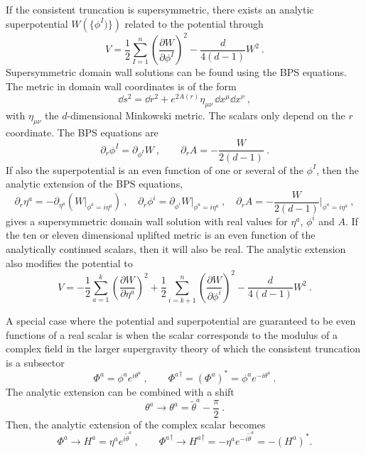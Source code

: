 If the consistent truncation is supersymmetric, there exists an analytic superpotential $W\left(\{\phi^I)\}\right)$ related to the potential through
\begin{equation}
V=\frac{1}{2}\sum_{I=1}^n\left(\frac{\partial W}{\partial \phi^I}\right)^2-\frac{d}{4(d-1)}W^2\ .
\end{equation}
Supersymmetric domain wall solutions can be found using the BPS equations. The metric in domain wall coordinates is of the form
\begin{equation}
	\label{eq:domain_wall}
	\dd s^2
	=
	\dd r^2 + e^{2A(r)}\eta_{\mu\nu}\,\dd x^\mu \dd x^\nu\ ,
\end{equation}
with $\eta_{\mu\nu}$ the $d$-dimensional Minkowski metric. The scalars only depend on the $r$ coordinate. The BPS equations are
\begin{equation}
	\partial_r\phi^I=\partial_{\phi^I}W\ ,\qquad \partial_r A= -\frac{W}{2(d-1)}\ .
\end{equation}
If also the superpotential is an even function of one or several of the $\phi^I$, then the analytic extension of the BPS equations,
\begin{equation}\label{eq:BPS}
	\partial_r \eta^a=-\partial_{\eta^a}\left( W\Big|_{\phi^a=i \eta^a}\right)\ ,\quad \partial_r \phi^i =\partial_{\phi^i}W\Big|_{\phi^a=i \eta^a}\ , \quad  \partial_r A= -\frac{W}{2(d-1)}\Big|_{\phi^a=i \eta^a}\ ,
\end{equation}
gives a supersymmetric domain wall solution with real values for $\eta^a$, $\phi^i$ and $A$. If the ten or eleven dimensional uplifted metric is an even function of the analytically continued scalars, then it will also be real. The analytic extension also modifies the potential to
\begin{equation}
\label{eq:VfromW}
V=-\frac{1}{2}\sum_{a=1}^k\left(\frac{\partial W}{\partial \eta^a}\right)^2+\frac{1}{2}\sum_{i=k+1}^n\left(\frac{\partial W}{\partial \phi^i}\right)^2-\frac{d}{4(d-1)}W^2\ .
\end{equation}

A special case where the potential and superpotential are guaranteed to be even functions of a real scalar is when the scalar corresponds to the modulus of a complex field in the larger supergravity theory of which the consistent truncation is a subsector
\begin{equation}
	\Phi^a=\phi^a e^{i\theta^a}\ ,\qquad {\Phi^a}^\dagger=(\Phi^a)^*=\phi^a e^{-i\theta^a}\ .
\end{equation}
The analytic extension can be combined with a shift
\begin{equation}
	\theta^a\to \theta^a=\tilde\theta^a-\frac{\pi}{2}\ .
\end{equation}
Then, the analytic extension of the complex scalar becomes
\begin{equation}
	\Phi^a\to H^a=\eta^a e^{i\tilde\theta^a}\ ,\qquad {\Phi^a}^\dagger\to {H^a}^\dagger=-\eta^a e^{-i\tilde\theta^a}=-(H^a)^*.
\end{equation}

